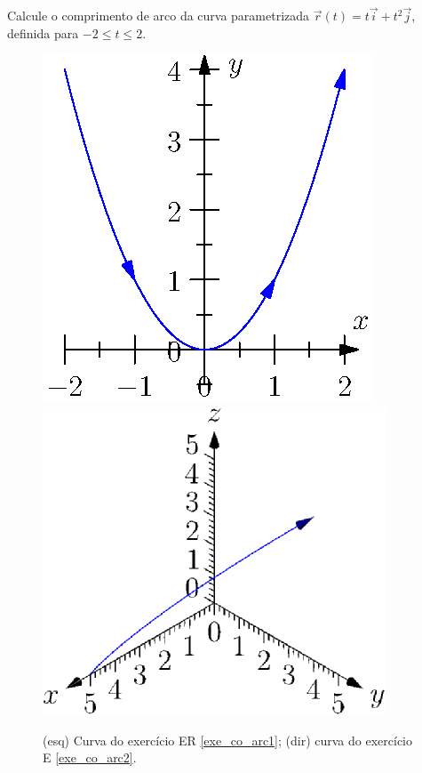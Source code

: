 \begin{exeresol} \label{exe_co_arc1}
Calcule o comprimento de arco da curva parametrizada $\vec{r}(t) = t \vec{i} + t^2 \vec{j}$, definida para $-2 \leq t \leq 2$.
\end{exeresol}
\begin{figure}
  \centering
      \includegraphics{./cap_curvas/figs/comprimento_arco_parabola}
      \includegraphics{./cap_curvas/figs/comprimento_arco_curva}
  \caption{(esq) Curva do exercício ER \ref{exe_co_arc1}; (dir) curva do exercício E \ref{exe_co_arc2}.}\label{fig_co_arc1}
  \end{figure}

